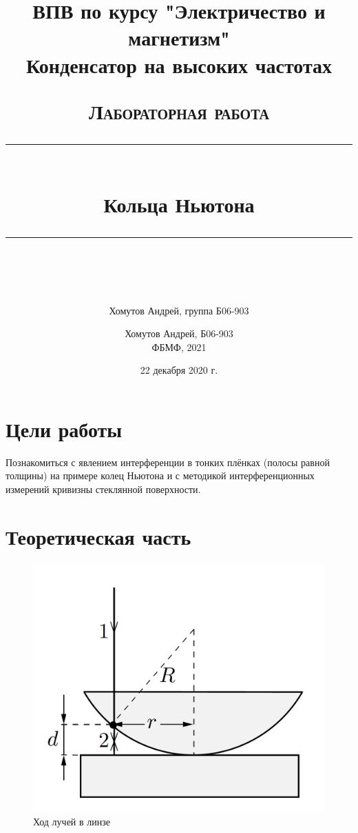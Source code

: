 \documentclass[a4paper, 12pt]{article}
\author{Хомутов Андрей, группа Б06-903}
\title{ВПВ по курсу "Электричество и магнетизм" \\ Конденсатор на высоких частотах}
\date{22 декабря 2020 г.}
\newcommand{\HRule}[1]{\rule{\linewidth}{#1}}
\begin{document}
\title{ \normalsize \textsc{Лабораторная работа}
		\\ [4.0cm]
		\HRule{0.5pt} \\ [0.3cm]
		\LARGE \textbf{{Кольца Ньютона}}
		\HRule{0.5pt} \\ [0.1cm]
		\normalsize  \vspace*{18\baselineskip}}

\date{}

\author{%
		Хомутов Андрей, Б06-903 \\
ФБМФ, 2021\\ }

\maketitle
\thispagestyle{empty}
\newpage
\section*{Цели работы} 
Познакомиться с явлением интерференции в тонких плёнках (полосы равной толщины) на примере колец Ньютона и с методикой интерференционных измерений кривизны стеклянной поверхности.
 
\section{Теоретическая часть}

\begin{figure} 
		\includegraphics[width=\linewidth]{ring}
		\caption{Ход лучей в линзе}
		\label{ring}
\end{figure}
\end{document}
